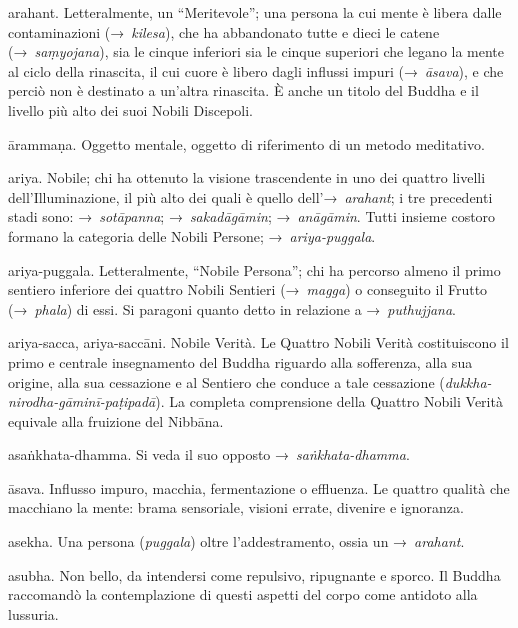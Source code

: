 \begin{glossarydescription}
\item[arahant.] Letteralmente, un ``Meritevole''; una
  persona la cui mente è libera dalle contaminazioni (→~\emph{kilesa}), che ha
  abbandonato tutte e dieci le catene (→~\emph{saṃyojana}), sia le cinque
  inferiori sia le cinque superiori che legano la mente al ciclo della
  rinascita, il cui cuore è libero dagli influssi impuri (→~\emph{āsava}), e che
  perciò non è destinato a un'altra rinascita. È anche un titolo del Buddha e il
  livello più alto dei suoi Nobili Discepoli.

\item[ārammaṇa.] Oggetto mentale, oggetto di riferimento di un metodo
  meditativo.

\item[ariya.] Nobile; chi ha ottenuto la visione trascendente in uno dei
  quattro livelli dell'Illuminazione, il più alto dei quali è quello
  dell'→~\emph{arahant}; i tre precedenti stadi sono: →~\emph{sotāpanna};
  →~\emph{sakadāgāmin}; →~\emph{anāgāmin}. Tutti insieme costoro formano la
  categoria delle Nobili Persone; →~\emph{ariya-puggala}.

\item[ariya-puggala.] Letteralmente, ``Nobile Persona''; chi ha percorso
  almeno il primo sentiero inferiore dei quattro Nobili Sentieri
  (→~\emph{magga}) o conseguito il Frutto (→~\emph{phala}) di essi. Si paragoni
  quanto detto in relazione a →~\emph{puthujjana}.

\item[ariya-sacca, ariya-saccāni.] Nobile Verità. Le Quattro Nobili Verità
  costituiscono il primo e centrale insegnamento del Buddha riguardo alla
  sofferenza, alla sua origine, alla sua cessazione e al Sentiero che conduce a
  tale cessazione (\emph{dukkha-nirodha-gāminī-paṭipadā}). La completa
  comprensione della Quattro Nobili Verità equivale alla fruizione del
  Nibbāna.

\item[asaṅkhata-dhamma.] Si veda il suo opposto →~\emph{saṅkhata-dhamma}.

\item[āsava.] Influsso impuro, macchia, fermentazione o effluenza. Le
  quattro qualità che macchiano la mente: brama sensoriale, visioni errate,
  divenire e ignoranza.

\item[asekha.] Una persona (\emph{puggala}) oltre l'addestramento, ossia
  un →~\emph{arahant}.

\item[asubha.] Non bello, da intendersi come repulsivo, ripugnante e
  sporco. Il Buddha raccomandò la contemplazione di questi aspetti del corpo
  come antidoto alla lussuria.


\end{glossarydescription}
